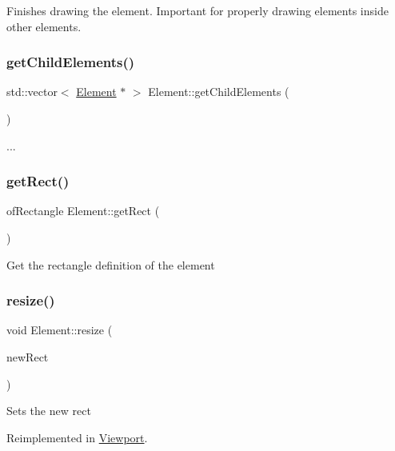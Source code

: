 Finishes drawing the element. Important for properly drawing elements inside other elements. \mbox{\label{class_element_af48e62b627817b2fb3f1d7ab120820af}} 
\subsubsection{\texorpdfstring{get\+Child\+Elements()}{getChildElements()}}
{\footnotesize\ttfamily std\+::vector$<$ \hyperlink{class_element}{Element} $\ast$ $>$ Element\+::get\+Child\+Elements (\begin{DoxyParamCaption}{ }\end{DoxyParamCaption})}

... \mbox{\label{class_element_afc58e4696e16d692b53c8ece12387496}} 
\subsubsection{\texorpdfstring{get\+Rect()}{getRect()}}
{\footnotesize\ttfamily of\+Rectangle Element\+::get\+Rect (\begin{DoxyParamCaption}{ }\end{DoxyParamCaption})}

Get the rectangle definition of the element \mbox{\label{class_element_a9d78e1489e80f210a8f5cc9e5d5b07d3}} 
\subsubsection{\texorpdfstring{resize()}{resize()}}
{\footnotesize\ttfamily void Element\+::resize (\begin{DoxyParamCaption}\item[{of\+Rectangle}]{new\+Rect }\end{DoxyParamCaption})\hspace{0.3cm}{\ttfamily [virtual]}}

Sets the new rect 

Reimplemented in \hyperlink{class_viewport_a7c8543f8de21b83de2d850c3597d40ec}{Viewport}.

\mbox{\label{class_element_af89dcf0a470753cf1fecd8556a802c63}} 

